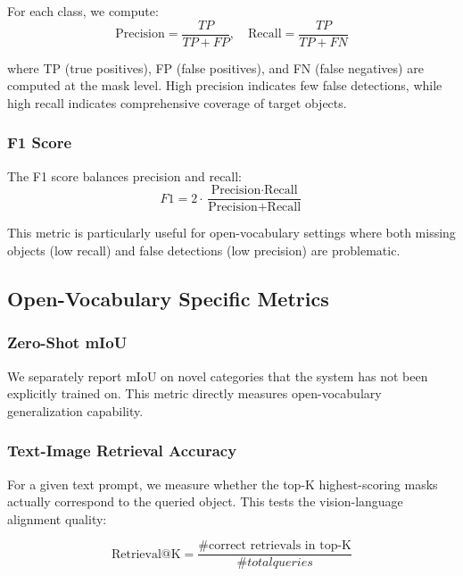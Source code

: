 For each class, we compute:
\begin{equation}
\text{Precision} = \frac{TP}{TP + FP}, \quad \text{Recall} = \frac{TP}{TP + FN}
\end{equation}

where TP (true positives), FP (false positives), and FN (false negatives) are computed at the mask level. High precision indicates few false detections, while high recall indicates comprehensive coverage of target objects.

\subsubsection{F1 Score}

The F1 score balances precision and recall:
\begin{equation}
F1 = 2 \cdot \frac{\text{Precision} \cdot \text{Recall}}{\text{Precision} + \text{Recall}}
\end{equation}

This metric is particularly useful for open-vocabulary settings where both missing objects (low recall) and false detections (low precision) are problematic.

\subsection{Open-Vocabulary Specific Metrics}

\subsubsection{Zero-Shot mIoU}

We separately report mIoU on novel categories that the system has not been explicitly trained on. This metric directly measures open-vocabulary generalization capability.

\subsubsection{Text-Image Retrieval Accuracy}

For a given text prompt, we measure whether the top-K highest-scoring masks actually correspond to the queried object. This tests the vision-language alignment quality:

\begin{equation}
\text{Retrieval@K} = \frac{\text{\# correct retrievals in top-K}}{{\# total queries}}
\end{equation}

